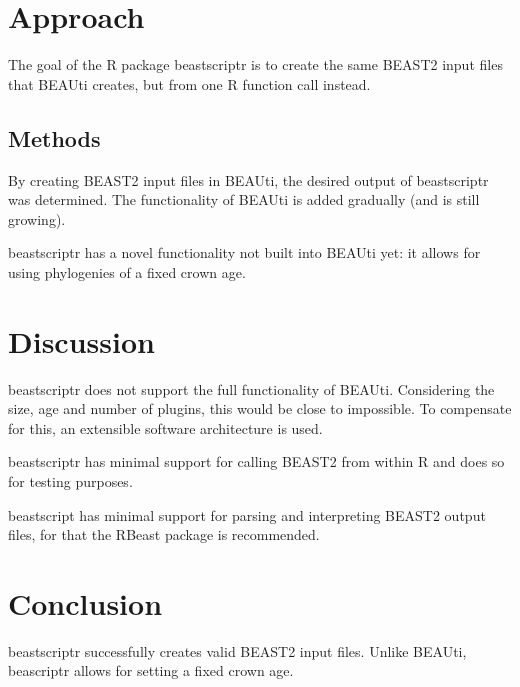 \documentclass{bioinfo}
\begin{document}
\section{Approach}

The goal of the R package beastscriptr is to create the 
same BEAST2 input files that BEAUti creates, but from one R function call 
instead.

\begin{methods}
\section{Methods}

By creating BEAST2 input files in BEAUti, 
the desired output of beastscriptr was determined. 
The functionality of BEAUti is added gradually (and is still growing).

beastscriptr has a novel functionality not built into BEAUti yet:
it allows for using phylogenies of a fixed crown age. 

\end{methods}

\section{Discussion}

beastscriptr does not support the full functionality of BEAUti. Considering
the size, age and number of plugins, this would be close to impossible.
To compensate for this, an extensible software architecture is used.

beastscriptr has minimal support for calling BEAST2 from within R and does
so for testing purposes. 

beastscript has minimal support for parsing and interpreting BEAST2 output files,
for that the RBeast package is recommended.

\section{Conclusion}

beastscriptr successfully creates valid BEAST2 input files. Unlike BEAUti,
beascriptr allows for setting a fixed crown age.
\end{document}
